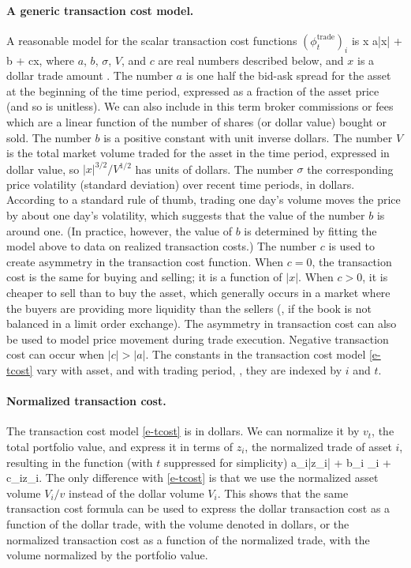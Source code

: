 \documentclass[openany]{now}
\newcommand{\trcost}{\phi^\mathrm{trade}}
\begin{document}
\paragraph{A generic transaction cost model.}
A reasonable model for the scalar transaction cost functions $(\trcost_t)_i$ is
\BEQ\label{e-tcost}
x \mapsto a|x| + b \sigma {} + cx,
\EEQ
where $a$, $b$, $\sigma$, $V$, and $c$ are real numbers described below,
and $x$ is a dollar trade amount \cite{grinold1999active}.
The number $a$ is one half the bid-ask spread for the asset
at the beginning of the time period, expressed as a fraction of the
asset price (and so is unitless).
We can also include in this term
broker commissions or fees which are a linear
function of the number of shares (or dollar value) bought or sold.
The number $b$ is a positive constant with unit inverse dollars.
The number $V$ is the total market volume traded
for the asset in the time period, expressed in dollar value,
so $|x|^{3/2}/V^{1/2}$ has units of dollars.
The number $\sigma$ the corresponding price volatility
(standard deviation) over recent time periods, in dollars.
According to a standard rule of thumb,
trading one day's volume moves the
price by about one day's volatility, which suggests that the value of
the number $b$ is around one.
(In practice, however, the value of $b$ is determined
by fitting the model above to data on realized transaction costs.)
The number $c$ is used to create asymmetry in the transaction
cost function.  When $c=0$, the transaction cost is the same for
buying and selling; it is a function of $|x|$.  When $c>0$,
it is cheaper to sell than to buy the asset,
which generally occurs in a market where
the buyers are providing more liquidity than the sellers
(\eg, if the book is not balanced in a limit order exchange).
The asymmetry in transaction cost can also be used to model
price movement during trade execution.
Negative transaction cost can occur when $|c| > |a|$.
The constants in the transaction cost model \eqref{e-tcost} vary with asset,
and with trading period, \ie, they are indexed by $i$ and $t$.

\paragraph{Normalized transaction cost.}
The transaction cost model \eqref{e-tcost} is in dollars.
We can normalize it by $v_t$, the total portfolio value, and
express it in terms of $z_i$, the normalized trade of asset $i$,
resulting in the function (with $t$ suppressed for simplicity)
\BEQ\label{e-tcost-weights}
a_i|z_i| + b_i \sigma_i  + c_iz_i.
\EEQ
The only difference with \eqref{e-tcost} is that we use
the normalized asset volume $V_i/v$ instead of the dollar volume $V_i$.
This shows that the same transaction cost formula can be used to express
the dollar transaction cost as a function of the dollar trade, with
the volume denoted in dollars,
or the normalized transaction cost as a function of the normalized
trade, with the volume normalized by the portfolio value.
\end{document}
